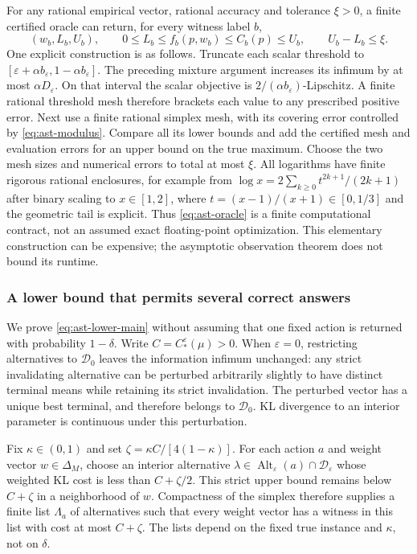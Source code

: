 \documentclass{article}
\theoremstyle{plain}
\theoremstyle{definition}
\begin{document}
For any rational empirical vector, rational accuracy and tolerance $\xi>0$,
a finite certified oracle can return, for every witness label $b$,
\begin{equation}
 (w_b,L_b,U_b),\qquad
 0\le L_b\le f_b(p,w_b)\le C_b(p)\le U_b,
 \qquad U_b-L_b\le\xi.
 \label{eq:ast-oracle}
\end{equation}
One explicit construction is as follows.  Truncate each scalar threshold to
$[\varepsilon+\alpha b_\varepsilon,1-\alpha b_\varepsilon]$.  The preceding
mixture argument increases its infimum by at most
$\alpha D_\varepsilon$.  On that interval the scalar objective is
$2/(\alpha b_\varepsilon)$-Lipschitz.  A finite rational threshold mesh
therefore brackets each value to any prescribed positive error.  Next use a
finite rational simplex mesh, with its covering error controlled by
\eqref{eq:ast-modulus}.  Compare all its lower bounds and add the certified
mesh and evaluation errors for an upper bound on the true maximum.
Choose the two mesh sizes and numerical errors to total at most $\xi$.
All logarithms have finite rigorous rational enclosures, for example from
$\log x=2\sum_{k\ge0}t^{2k+1}/(2k+1)$ after binary scaling to $x\in[1,2]$,
where $t=(x-1)/(x+1)\in[0,1/3]$ and the geometric tail is explicit.
Thus \eqref{eq:ast-oracle} is a finite computational contract, not an assumed
exact floating-point optimization.  This elementary construction can be
expensive; the asymptotic observation theorem does not bound its runtime.

\subsubsection{A lower bound that permits several correct answers}
\label{app:ast-lower}
We prove \eqref{eq:ast-lower-main} without assuming that one fixed action
is returned with probability $1-\delta$.  Write $C=C_*^\varepsilon(\mu)>0$.
When $\varepsilon=0$, restricting alternatives to $\mathcal D_0$ leaves the
information infimum unchanged: any strict invalidating alternative can be
perturbed arbitrarily slightly to have distinct terminal means while retaining
its strict invalidation.  The perturbed vector has a unique best terminal,
and therefore belongs to $\mathcal D_0$.  KL divergence to an interior
parameter is continuous under this perturbation.

Fix $\kappa\in(0,1)$ and set
$\zeta=\kappa C/[4(1-\kappa)]$.  For each action $a$ and weight vector
$w\in\Delta_M$, choose an interior alternative
$\lambda\in\operatorname{Alt}_\varepsilon(a)\cap\mathcal D_\varepsilon$
whose weighted KL cost is less than $C+\zeta/2$.
This strict upper bound remains below $C+\zeta$ in a neighborhood of $w$.
Compactness of the simplex therefore supplies a finite list $\Lambda_a$ of
alternatives such that every weight vector has a witness in this list with
cost at most $C+\zeta$.  The lists depend on the fixed true instance and
$\kappa$, not on $\delta$.
\end{document}
